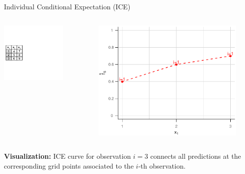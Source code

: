 \documentclass[aspectratio=169]{../latex_main/tntbeamer}  %
\begin{document}
\begin{frame}{Individual Conditional Expectation (ICE)}

\begin{columns}[T]
\begin{column}{0.55\textwidth}
\vspace*{-\topsep}
\vspace*{0.5\lineskip}
\includegraphics[page=7, trim=-3.69cm 0cm 3.69cm 0cm, width=0.7\textwidth]{figure/ice_pd_plot_demo}
\end{column}
\begin{column}{0.45\textwidth}

\begin{center}
\includegraphics[page=3, width=0.9\textwidth]{figure/ICE}
\end{center}

\end{column}
\end{columns}
\vspace*{\topsep}

\textbf{Visualization:} ICE curve for observation $i=3$ connects all predictions at the corresponding grid points associated to the $i$-th observation.
\end{frame}
\end{document}
